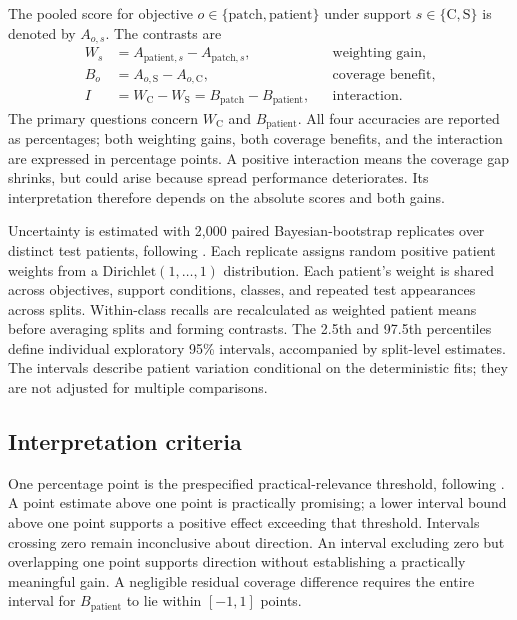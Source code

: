 \documentclass[11pt]{article}
\newcommand{\conc}{\mathrm{C}}
\newcommand{\spr}{\mathrm{S}}
\begin{document}
The pooled score for objective \(o\in\{\mathrm{patch},\mathrm{patient}\}\) under support \(s\in\{\conc,\spr\}\) is denoted by \(A_{o,s}\). The contrasts are
\begin{align}
 W_s&=A_{\mathrm{patient},s}-A_{\mathrm{patch},s}, &&\text{weighting gain},\label{eq:gain}\\
 B_o&=A_{o,\spr}-A_{o,\conc}, &&\text{coverage benefit},\label{eq:coverage}\\
 I&=W_{\conc}-W_{\spr}=B_{\mathrm{patch}}-B_{\mathrm{patient}},
 &&\text{interaction}.\label{eq:interaction}
\end{align}
\noindent The primary questions concern \(W_{\conc}\) and \(B_{\mathrm{patient}}\). All four accuracies are reported as percentages; both weighting gains, both coverage benefits, and the interaction are expressed in percentage points. A positive interaction means the coverage gap shrinks, but could arise because spread performance deteriorates. Its interpretation therefore depends on the absolute scores and both gains.

Uncertainty is estimated with 2,000 paired Bayesian-bootstrap replicates over distinct test patients, following \citet{queisler2026patientShortage}. Each replicate assigns random positive patient weights from a \(\mathrm{Dirichlet}(1,\ldots,1)\) distribution. Each patient's weight is shared across objectives, support conditions, classes, and repeated test appearances across splits. Within-class recalls are recalculated as weighted patient means before averaging splits and forming contrasts. The 2.5th and 97.5th percentiles define individual exploratory 95\% intervals, accompanied by split-level estimates. The intervals describe patient variation conditional on the deterministic fits; they are not adjusted for multiple comparisons.

\subsection{Interpretation criteria}
\label{sec:interpretation}
One percentage point is the prespecified practical-relevance threshold, following \citet{queisler2026patientShortage}. A point estimate above one point is practically promising; a lower interval bound above one point supports a positive effect exceeding that threshold. Intervals crossing zero remain inconclusive about direction. An interval excluding zero but overlapping one point supports direction without establishing a practically meaningful gain. A negligible residual coverage difference requires the entire interval for \(B_{\mathrm{patient}}\) to lie within \([-1,1]\) points.
\end{document}
